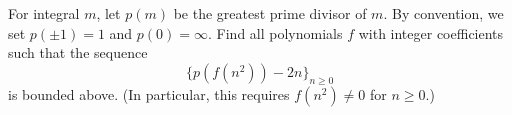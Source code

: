 For integral $m$,  let $p(m)$ be the greatest prime divisor of $m.$ By convention, we set $p(\pm 1) = 1$ and $p(0) = \infty.$ Find all polynomials $f$ with integer coefficients such that the sequence\[ \{p \left( f \left( n^2 \right) \right) - 2n \}_{n \geq 0}  \] is bounded above. (In particular, this requires $f \left (n^2 \right ) \neq 0$ for $n \geq 0.$)